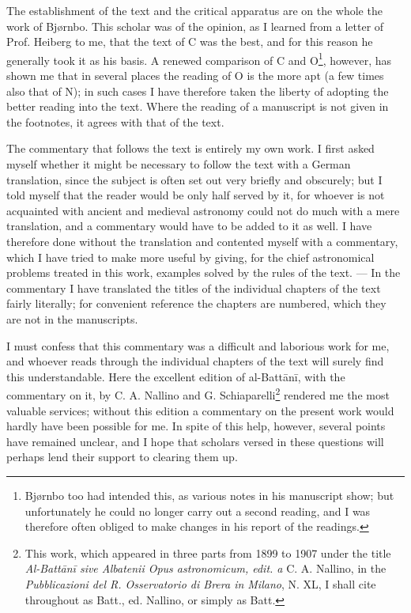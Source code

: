 \documentclass[11pt]{article}
\begin{document}
\par The establishment of the text and the critical apparatus are on the whole the work of Bjørnbo. This scholar was of the opinion, as I learned from a letter of Prof. Heiberg to me, that the text of C was the best, and for this reason he generally took it as his basis. A renewed comparison of C and O\footnote{Bjørnbo too had intended this, as various notes in his manuscript show; but unfortunately he could no longer carry out a second reading, and I was therefore often obliged to make changes in his report of the readings.}, however, has shown me that in several places the reading of O is the more apt (a few times also that of N); in such cases I have therefore taken the liberty of adopting the better reading into the text. Where the reading of a manuscript is not given in the footnotes, it agrees with that of the text.\par
\par The commentary that follows the text is entirely my own work. I first asked myself whether it might be necessary to follow the text with a German translation, since the subject is often set out very briefly and obscurely; but I told myself that the reader would be only half served by it, for whoever is not acquainted with ancient and medieval astronomy could not do much with a mere translation, and a commentary would have to be added to it as well. I have therefore done without the translation and contented myself with a commentary, which I have tried to make more useful by giving, for the chief astronomical problems treated in this work, examples solved by the rules of the text. — In the commentary I have translated the titles of the individual chapters of the text fairly literally; for convenient reference the chapters are numbered, which they are not in the manuscripts.\par
\par I must confess that this commentary was a difficult and laborious work for me, and whoever reads through the individual chapters of the text will surely find this understandable. Here the excellent edition of al-Battānī, with the commentary on it, by C. A. Nallino and G. Schiaparelli\footnote{This work, which appeared in three parts from 1899 to 1907 under the title \emph{Al-Battānī sive Albatenii Opus astronomicum, edit. a} C. A. Nallino, in the \emph{Pubblicazioni del R. Osservatorio di Brera in Milano}, N. XL, I shall cite throughout as Batt., ed. Nallino, or simply as Batt.} rendered me the most valuable services; without this edition a commentary on the present work would hardly have been possible for me. In spite of this help, however, several points have remained unclear, and I hope that scholars versed in these questions will perhaps lend their support to clearing them up.\par
\end{document}
